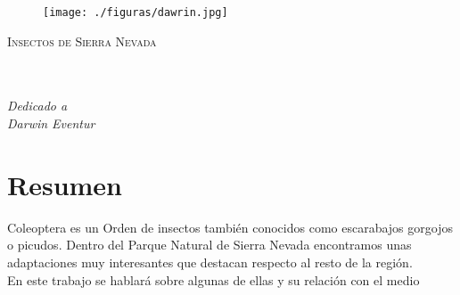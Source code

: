 \documentclass[a4paper,openright,12pt]{book}
\begin{document}
\begin{titlepage} 


\begin{figure}[htb]
\begin{center}
\texttt{[image: ./figuras/dawrin.jpg]}
\end{center}
\end{figure}
\begin{center} 
\begin{Huge} 
\textsc{Insectos de Sierra Nevada} 
\end{Huge} 
\end{center} 
\end{titlepage}
\newpage
$\ $
\thispagestyle{empty}
\chapter*{}
\begin{flushright}
\textit{Dedicado a \\
Darwin Eventur}
\end{flushright}
\newpage
\tableofcontents
\newpage
\listoffigures
\chapter*{Resumen}
Coleoptera es un Orden de insectos tambi\'{e}n conocidos como escarabajos gorgojos o picudos. Dentro del Parque Natural de Sierra Nevada encontramos unas adaptaciones muy interesantes que destacan respecto al resto de la regi\'{o}n. \\ En este trabajo se hablar\'{a} sobre algunas de ellas y su relaci\'{o}n con el medio

\end{document}

